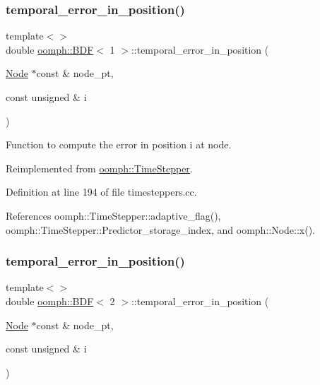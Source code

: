 \subsubsection{\texorpdfstring{temporal\+\_\+error\+\_\+in\+\_\+position()}{temporal\_error\_in\_position()}\hspace{0.1cm}{\footnotesize\ttfamily [1/4]}}
{\footnotesize\ttfamily template$<$$>$ \\
double \hyperlink{classoomph_1_1BDF}{oomph\+::\+B\+DF}$<$ 1 $>$\+::temporal\+\_\+error\+\_\+in\+\_\+position (\begin{DoxyParamCaption}\item[{\hyperlink{classoomph_1_1Node}{Node} $\ast$const \&}]{node\+\_\+pt,  }\item[{const unsigned \&}]{i }\end{DoxyParamCaption})\hspace{0.3cm}{\ttfamily [virtual]}}



Function to compute the error in position i at node. 



Reimplemented from \hyperlink{classoomph_1_1TimeStepper_ac463807aff4bcbedd6e8a463c7390536}{oomph\+::\+Time\+Stepper}.



Definition at line 194 of file timesteppers.\+cc.



References oomph\+::\+Time\+Stepper\+::adaptive\+\_\+flag(), oomph\+::\+Time\+Stepper\+::\+Predictor\+\_\+storage\+\_\+index, and oomph\+::\+Node\+::x().

\mbox{\label{classoomph_1_1BDF_ad426b903004b13c34dd8df5ea2e1fec5}} 
\subsubsection{\texorpdfstring{temporal\+\_\+error\+\_\+in\+\_\+position()}{temporal\_error\_in\_position()}\hspace{0.1cm}{\footnotesize\ttfamily [2/4]}}
{\footnotesize\ttfamily template$<$$>$ \\
double \hyperlink{classoomph_1_1BDF}{oomph\+::\+B\+DF}$<$ 2 $>$\+::temporal\+\_\+error\+\_\+in\+\_\+position (\begin{DoxyParamCaption}\item[{\hyperlink{classoomph_1_1Node}{Node} $\ast$const \&}]{node\+\_\+pt,  }\item[{const unsigned \&}]{i }\end{DoxyParamCaption})\hspace{0.3cm}{\ttfamily [virtual]}}




